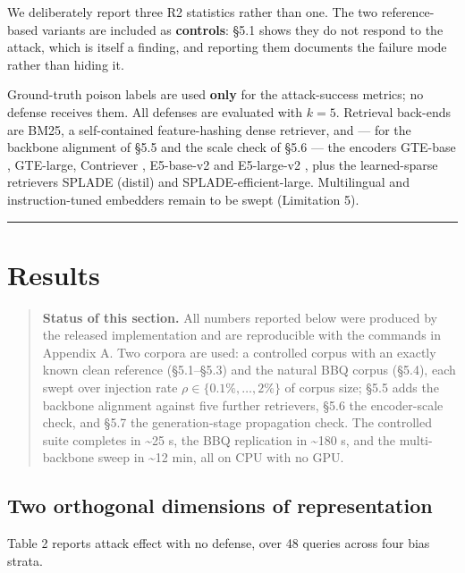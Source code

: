 \documentclass[authoryear,review,3p,times]{elsarticle}
\begin{document}
We deliberately report three R2 statistics rather than one. The two reference-based variants are included as \textbf{controls}: §5.1 shows they do not respond to the attack, which is itself a finding, and reporting them documents the failure mode rather than hiding it.

Ground-truth poison labels are used \textbf{only} for the attack-success metrics; no defense receives them. All defenses are evaluated with \(k = 5\). Retrieval back-ends are BM25, a self-contained feature-hashing dense retriever, and --- for the backbone alignment of §5.5 and the scale check of §5.6 --- the encoders GTE-base \citeauthor{zhao2026}, GTE-large, Contriever \citeauthor{kim2025b}, E5-base-v2 and E5-large-v2 \citeyearpar{wang2025,wu2025}, plus the learned-sparse retrievers SPLADE (distil) and SPLADE-efficient-large. Multilingual and instruction-tuned embedders remain to be swept (Limitation 5).

\begin{center}\rule{0.5\linewidth}{0.5pt}\end{center}

\section{Results}\label{results}

\begin{quote}
\textbf{Status of this section.} All numbers reported below were produced by the released implementation and are reproducible with the commands in Appendix A. Two corpora are used: a controlled corpus with an exactly known clean reference (§5.1--§5.3) and the natural BBQ corpus (§5.4), each swept over injection rate \(\rho \in \{0.1\%, \dots, 2\%\}\) of corpus size; §5.5 adds the backbone alignment against five further retrievers, §5.6 the encoder-scale check, and §5.7 the generation-stage propagation check. The controlled suite completes in \textasciitilde25 s, the BBQ replication in \textasciitilde180 s, and the multi-backbone sweep in \textasciitilde12 min, all on CPU with no GPU.
\end{quote}

\subsection{Two orthogonal dimensions of representation}\label{pairwise-poisoning-is-an-r2-attack-not-an-r1-attack}

Table 2 reports attack effect with no defense, over 48 queries across four bias strata.
\end{document}
